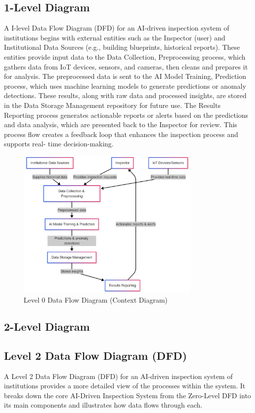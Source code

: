 \documentclass[12pt,a4paper]{report}
\begin{document}
\subsection{1-Level Diagram}
A I-level Data Flow Diagram (DFD) for an AI-driven inspection system of institutions begins with external entities such as the Inspector (user) and Institutional Data Sources (e.g., building blueprints, historical reports). These entities provide input data to the Data Collection, Preprocessing process, which gathers data from IoT devices, sensors, and cameras, then cleans and prepares it for analysis. The preprocessed data is sent to the AI Model Training, Prediction process, which uses machine learning models to generate predictions or anomaly detections. These results, along with raw data and processed insights, are stored in the Data Storage Management repository for future use. The Results Reporting process generates actionable reports or alerts based on the predictions and data analysis, which are presented back to the Inspector for review. This process flow creates a feedback loop that enhances the inspection process and supports real- time decision-making.
\begin{figure}[H]
    \centering
    \includegraphics[width=0.8\textwidth]{images/level 2.png} %
    \caption{Level 0 Data Flow Diagram (Context Diagram)}
    \label{fig:level-1-dfd}
\end{figure}
\subsection{2-Level Diagram}
\subsection{Level 2 Data Flow Diagram (DFD)}
A Level 2 Data Flow Diagram (DFD) for an AI-driven inspection system of institutions provides a more detailed view of the processes within the system. It breaks down the core AI-Driven Inspection System from the Zero-Level DFD into its main components and illustrates how data flows through each.
\end{document}
